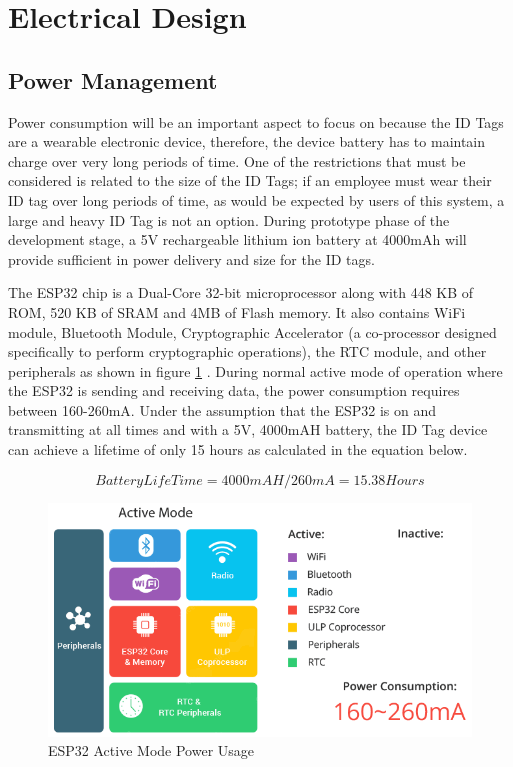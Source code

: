 

\setcounter{section}{4}
\section{Electrical Design}
\bigskip

\subsection{Power Management}
\medskip

Power consumption will be an important aspect to focus on because the ID Tags are a wearable electronic device, therefore, the device battery has to maintain charge over very long periods of time. One of the restrictions that must be considered is related to the size of the ID Tags; if an employee must wear their ID tag over long periods of time, as would be expected by users of this system, a large and heavy ID Tag is not an option. During prototype phase of the development stage, a 5V rechargeable lithium ion battery at 4000mAh will provide sufficient in power delivery and size for the ID tags. 

\bigskip
The ESP32 chip is a Dual-Core 32-bit microprocessor along with 448 KB of ROM, 520 KB of SRAM and 4MB of Flash memory. It also contains WiFi module, Bluetooth Module, Cryptographic Accelerator (a co-processor designed specifically to perform cryptographic operations), the RTC module, and other peripherals as shown in figure \ref{a_mode} \cite{R5-1-1}. During normal active mode of operation where the ESP32 is sending and receiving data, the power consumption requires between 160-260mA. Under the assumption that the ESP32 is on and transmitting at all times and with a 5V, 4000mAH battery, the ID Tag device can achieve a lifetime of only 15 hours as calculated in the equation below.

\medskip
\begin{equation}
Battery Life Time = 4000mAH/260mA = 15.38 Hours
\end{equation}

\medskip
\begin{figure}[H]
\centering
    \includegraphics[scale=0.7]{./images/active_mode.png}
    \caption{ESP32 Active Mode Power Usage}
    \label{a_mode}
\end{figure}

